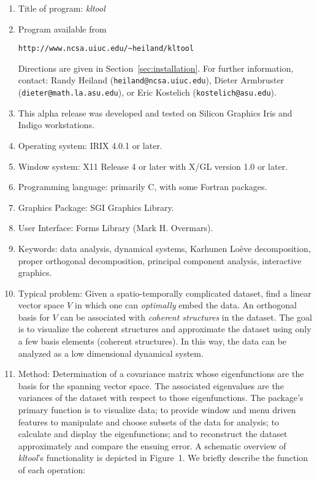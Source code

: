\begin{enumerate}
\item Title of program: {\sl kltool}
\item Program available from
	\begin{center}
	{\tt http://www.ncsa.uiuc.edu/\verb'~'heiland/kltool}
	\end{center}
	Directions are given in Section~\ref{sec:installation}.
	For further information, contact:  Randy Heiland ({\tt heiland@ncsa.uiuc.edu}), Dieter Armbruster
		({\tt dieter@math.la.asu.edu}), or Eric Kostelich
		({\tt kostelich@asu.edu}).
\item This alpha release was developed and
	tested on Silicon Graphics Iris and Indigo workstations. 
\item Operating system:  IRIX 4.0.1 or later.
\item Window system:  X11 Release 4 or later with X/GL version 1.0 or later.
\item Programming language: primarily C, with some Fortran packages.
\item Graphics Package: SGI Graphics Library.
\item User Interface: Forms Library (Mark H. Overmars).
\item Keywords: data analysis, dynamical
	systems,   Karhunen Lo\`{e}ve decomposition, proper
	orthogonal decomposition, principal component analysis,
	interactive graphics.
\item Typical problem: Given a spatio-temporally complicated
dataset, find a linear vector space $V$ in which one can {\sl optimally} embed
the data.  An orthogonal basis for $V$ can be associated
with {\sl coherent structures} in the dataset. The goal is to visualize
the coherent structures and approximate the dataset using only a few
basis elements (coherent structures).   In this way, the data can
be analyzed as a low dimensional dynamical system.
\item Method: Determination of a covariance matrix whose
eigenfunctions are the basis for the spanning vector space.  The
associated eigenvalues are the variances of the dataset with respect to
those eigenfunctions. The package's primary function is to visualize
data; to provide window and menu driven features to manipulate and
choose subsets of the data for analysis; to calculate and display
the eigenfunctions; and to reconstruct the dataset approximately
and compare the ensuing error.
A schematic overview of {\sl kltool}'s
functionality is depicted in Figure~1.  We briefly describe the
function of each operation:
\begin{figure}[t]


\end{figure}
\end{enumerate}
